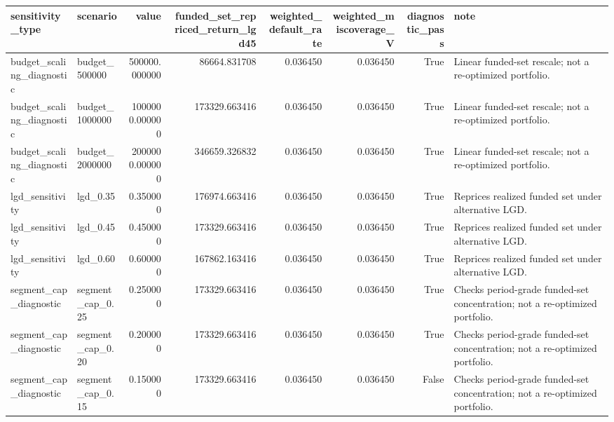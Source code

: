 \begin{tabular}{llrrrrrl}
\toprule
sensitivity\_type & scenario & value & funded\_set\_repriced\_return\_lgd45 & weighted\_default\_rate & weighted\_miscoverage\_V & diagnostic\_pass & note \\
\midrule
budget\_scaling\_diagnostic & budget\_500000 & 500000.000000 & 86664.831708 & 0.036450 & 0.036450 & True & Linear funded-set rescale; not a re-optimized portfolio. \\
budget\_scaling\_diagnostic & budget\_1000000 & 1000000.000000 & 173329.663416 & 0.036450 & 0.036450 & True & Linear funded-set rescale; not a re-optimized portfolio. \\
budget\_scaling\_diagnostic & budget\_2000000 & 2000000.000000 & 346659.326832 & 0.036450 & 0.036450 & True & Linear funded-set rescale; not a re-optimized portfolio. \\
lgd\_sensitivity & lgd\_0.35 & 0.350000 & 176974.663416 & 0.036450 & 0.036450 & True & Reprices realized funded set under alternative LGD. \\
lgd\_sensitivity & lgd\_0.45 & 0.450000 & 173329.663416 & 0.036450 & 0.036450 & True & Reprices realized funded set under alternative LGD. \\
lgd\_sensitivity & lgd\_0.60 & 0.600000 & 167862.163416 & 0.036450 & 0.036450 & True & Reprices realized funded set under alternative LGD. \\
segment\_cap\_diagnostic & segment\_cap\_0.25 & 0.250000 & 173329.663416 & 0.036450 & 0.036450 & True & Checks period-grade funded-set concentration; not a re-optimized portfolio. \\
segment\_cap\_diagnostic & segment\_cap\_0.20 & 0.200000 & 173329.663416 & 0.036450 & 0.036450 & True & Checks period-grade funded-set concentration; not a re-optimized portfolio. \\
segment\_cap\_diagnostic & segment\_cap\_0.15 & 0.150000 & 173329.663416 & 0.036450 & 0.036450 & False & Checks period-grade funded-set concentration; not a re-optimized portfolio. \\
\bottomrule
\end{tabular}
